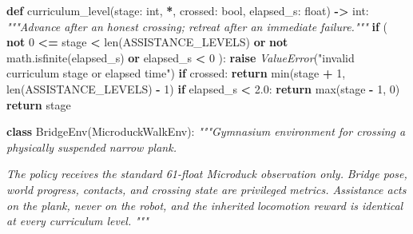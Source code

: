 \documentclass[
  american,
  11pt,
  letterpaper,
]{article}
\newenvironment{Shaded}{\begin{snugshade}}{\end{snugshade}}
\newcommand{\BuiltInTok}[1]{#1}
\newcommand{\CommentTok}[1]{\textcolor[rgb]{0.56,0.35,0.01}{\textit{#1}}}
\newcommand{\ControlFlowTok}[1]{\textcolor[rgb]{0.13,0.29,0.53}{\textbf{#1}}}
\newcommand{\DecValTok}[1]{\textcolor[rgb]{0.00,0.00,0.81}{#1}}
\newcommand{\FloatTok}[1]{\textcolor[rgb]{0.00,0.00,0.81}{#1}}
\newcommand{\KeywordTok}[1]{\textcolor[rgb]{0.13,0.29,0.53}{\textbf{#1}}}
\newcommand{\NormalTok}[1]{#1}
\newcommand{\OperatorTok}[1]{\textcolor[rgb]{0.81,0.36,0.00}{\textbf{#1}}}
\newcommand{\PreprocessorTok}[1]{\textcolor[rgb]{0.56,0.35,0.01}{\textit{#1}}}
\newcommand{\StringTok}[1]{\textcolor[rgb]{0.31,0.60,0.02}{#1}}
\renewenvironment{Shaded}{\par\smallskip}{\par\smallskip}
\begin{document}
\begin{Shaded}
\begin{Highlighting}[]
\KeywordTok{def}\NormalTok{ curriculum\_level(stage: }\BuiltInTok{int}\NormalTok{, }\OperatorTok{*}\NormalTok{, crossed: }\BuiltInTok{bool}\NormalTok{, elapsed\_s: }\BuiltInTok{float}\NormalTok{) }\OperatorTok{{-}\textgreater{}} \BuiltInTok{int}\NormalTok{:}
    \CommentTok{"""Advance after an honest crossing; retreat after an immediate failure."""}
    \ControlFlowTok{if}\NormalTok{ (}
        \KeywordTok{not} \DecValTok{0} \OperatorTok{\textless{}=}\NormalTok{ stage }\OperatorTok{\textless{}} \BuiltInTok{len}\NormalTok{(ASSISTANCE\_LEVELS)}
        \KeywordTok{or} \KeywordTok{not}\NormalTok{ math.isfinite(elapsed\_s)}
        \KeywordTok{or}\NormalTok{ elapsed\_s }\OperatorTok{\textless{}} \DecValTok{0}
\NormalTok{    ):}
        \ControlFlowTok{raise} \PreprocessorTok{ValueError}\NormalTok{(}\StringTok{"invalid curriculum stage or elapsed time"}\NormalTok{)}
    \ControlFlowTok{if}\NormalTok{ crossed:}
        \ControlFlowTok{return} \BuiltInTok{min}\NormalTok{(stage }\OperatorTok{+} \DecValTok{1}\NormalTok{, }\BuiltInTok{len}\NormalTok{(ASSISTANCE\_LEVELS) }\OperatorTok{{-}} \DecValTok{1}\NormalTok{)}
    \ControlFlowTok{if}\NormalTok{ elapsed\_s }\OperatorTok{\textless{}} \FloatTok{2.0}\NormalTok{:}
        \ControlFlowTok{return} \BuiltInTok{max}\NormalTok{(stage }\OperatorTok{{-}} \DecValTok{1}\NormalTok{, }\DecValTok{0}\NormalTok{)}
    \ControlFlowTok{return}\NormalTok{ stage}


\KeywordTok{class}\NormalTok{ BridgeEnv(MicroduckWalkEnv):}
    \CommentTok{"""Gymnasium environment for crossing a physically suspended narrow plank.}

\CommentTok{    The policy receives the standard 61{-}float Microduck observation only.}
\CommentTok{    Bridge pose, world progress, contacts, and crossing state are privileged}
\CommentTok{    metrics. Assistance acts on the plank, never on the robot, and the inherited}
\CommentTok{    locomotion reward is identical at every curriculum level.}
\CommentTok{    """}


\end{Highlighting}
\end{Shaded}
\end{document}
